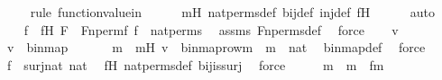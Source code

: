 \begin{isabellebody}
\ \ \ \ \isamarkupfalse%
{\isacharparenleft}{\kern0pt}rule\ function{\isacharunderscore}{\kern0pt}value{\isacharunderscore}{\kern0pt}in{\isacharparenright}{\kern0pt}\isanewline
\ \ \ \ \isamarkupfalse%
\ mH\ nat{\isacharunderscore}{\kern0pt}perms{\isacharunderscore}{\kern0pt}def\ bij{\isacharunderscore}{\kern0pt}def\ inj{\isacharunderscore}{\kern0pt}def\ fH\isanewline
\ \ \ \ \isamarkupfalse%
\ auto\isanewline
{}\isamarkupfalse%
\ \isanewline
\isanewline
\ \ \isamarkupfalse%
\ f\ \ fH{\isacharcolon}{\kern0pt}\ {\isachardoublequoteopen}F\ {\isacharequal}{\kern0pt}\ Fn{\isacharunderscore}{\kern0pt}perm{\isacharprime}{\kern0pt}{\isacharparenleft}{\kern0pt}f{\isacharparenright}{\kern0pt}{\isachardoublequoteclose}\ {\isachardoublequoteopen}f\ {\isasymin}\ nat{\isacharunderscore}{\kern0pt}perms{\isachardoublequoteclose}\ \isamarkupfalse%
\ assms\ Fn{\isacharunderscore}{\kern0pt}perms{\isacharunderscore}{\kern0pt}def\ \isamarkupfalse%
\ force\isanewline
\isanewline
\ \ \isamarkupfalse%
\ v\ \isanewline
\ \ \isamarkupfalse%
\ {\isachardoublequoteopen}v\ {\isasymin}\ binmap{\isacharprime}{\kern0pt}{\isachardoublequoteclose}\ \isanewline
\ \ \isamarkupfalse%
\ \isamarkupfalse%
\ m\ \ mH{\isacharcolon}{\kern0pt}\ {\isachardoublequoteopen}v\ {\isacharequal}{\kern0pt}\ {\isacharless}{\kern0pt}binmap{\isacharunderscore}{\kern0pt}row{\isacharprime}{\kern0pt}{\isacharparenleft}{\kern0pt}m{\isacharparenright}{\kern0pt}{\isacharcomma}{\kern0pt}\ {}{\isachargreater}{\kern0pt}{\isachardoublequoteclose}\ {\isachardoublequoteopen}m\ {\isasymin}\ nat{\isachardoublequoteclose}\ \isamarkupfalse%
\ binmap{\isacharprime}{\kern0pt}{\isacharunderscore}{\kern0pt}def\ \isamarkupfalse%
\ force\isanewline
\isanewline
\ \ \isamarkupfalse%
\ {\isachardoublequoteopen}f\ {\isasymin}\ surj{\isacharparenleft}{\kern0pt}nat{\isacharcomma}{\kern0pt}\ nat{\isacharparenright}{\kern0pt}{\isachardoublequoteclose}\ \isamarkupfalse%
\ fH\ nat{\isacharunderscore}{\kern0pt}perms{\isacharunderscore}{\kern0pt}def\ bij{\isacharunderscore}{\kern0pt}is{\isacharunderscore}{\kern0pt}surj\ \isamarkupfalse%
\ force\isanewline
\ \ \isamarkupfalse%
\ \isamarkupfalse%
\ m{\isacharprime}{\kern0pt}\ \ {\isachardoublequoteopen}m\ {\isacharequal}{\kern0pt}\ f{\isacharbackquote}{\kern0pt}m{\isacharprime}{\kern0pt}{\isachardoublequoteclose}\ \isamarkupfalse%

\end{isabellebody}
